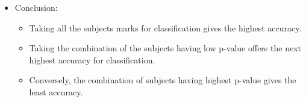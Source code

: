 \begin{itemize}
\begin{itemize}
		\item
		Worst case: \\
		L3\textunderscore MARKS, S1\textunderscore MARKS (p-value = 0.94523) are used for classification:
		\begin{itemize}
			\item
			Accuracy: 69.46\%
			\item
			95\% CI: (0.6857, 0.7033)
		\end{itemize}
	\end{itemize}
	
	\item
	Conclusion:
	\begin{itemize}
		\item
		Taking all the subjects marks for classification gives the highest accuracy.
		\item
		Taking the combination of the subjects having low p-value offers the next highest accuracy for classification.
		\item
		Conversely, the combination of subjects having highest p-value gives the least accuracy.
	\end{itemize}
\end{itemize}